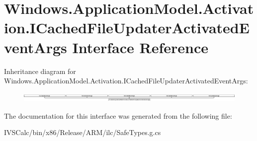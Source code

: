 \hypertarget{interface_windows_1_1_application_model_1_1_activation_1_1_i_cached_file_updater_activated_event_args}{}\section{Windows.\+Application\+Model.\+Activation.\+I\+Cached\+File\+Updater\+Activated\+Event\+Args Interface Reference}
\label{interface_windows_1_1_application_model_1_1_activation_1_1_i_cached_file_updater_activated_event_args}
Inheritance diagram for Windows.\+Application\+Model.\+Activation.\+I\+Cached\+File\+Updater\+Activated\+Event\+Args\+:\begin{figure}[H]
\begin{center}
\leavevmode
\includegraphics[height=0.486957cm]{interface_windows_1_1_application_model_1_1_activation_1_1_i_cached_file_updater_activated_event_args}
\end{center}
\end{figure}


The documentation for this interface was generated from the following file\+:\begin{DoxyCompactItemize}
\item 
I\+V\+S\+Calc/bin/x86/\+Release/\+A\+R\+M/ilc/Safe\+Types.\+g.\+cs\end{DoxyCompactItemize}
